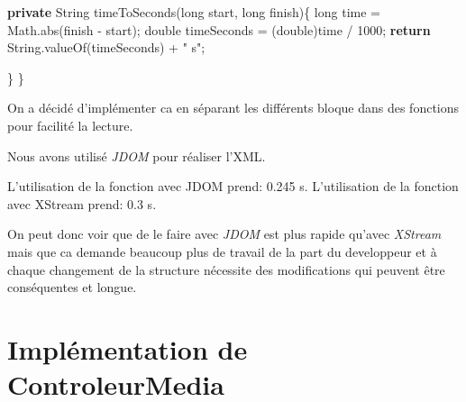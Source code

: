 \documentclass[]{article}
\newenvironment{Shaded}{}{}
\newcommand{\KeywordTok}[1]{\textcolor[rgb]{0.00,0.44,0.13}{\textbf{{#1}}}}
\newcommand{\DataTypeTok}[1]{\textcolor[rgb]{0.56,0.13,0.00}{{#1}}}
\newcommand{\DecValTok}[1]{\textcolor[rgb]{0.25,0.63,0.44}{{#1}}}
\newcommand{\StringTok}[1]{\textcolor[rgb]{0.25,0.44,0.63}{{#1}}}
\newcommand{\FunctionTok}[1]{\textcolor[rgb]{0.02,0.16,0.49}{{#1}}}
\newcommand{\BuiltInTok}[1]{{#1}}
\newcommand{\NormalTok}[1]{{#1}}
\begin{document}
\begin{Shaded}
\begin{Highlighting}[]
	\KeywordTok{private} \BuiltInTok{String} \FunctionTok{timeToSeconds}\NormalTok{(}\DataTypeTok{long} \NormalTok{start, }\DataTypeTok{long} \NormalTok{finish)\{}
		\DataTypeTok{long} \NormalTok{time = }\BuiltInTok{Math}\NormalTok{.}\FunctionTok{abs}\NormalTok{(finish - start);}
		\DataTypeTok{double} \NormalTok{timeSeconds = (}\DataTypeTok{double}\NormalTok{)time / }\DecValTok{1000}\NormalTok{;}
		\KeywordTok{return} \BuiltInTok{String}\NormalTok{.}\FunctionTok{valueOf}\NormalTok{(timeSeconds) + }\StringTok{" s"}\NormalTok{;}

	\NormalTok{\}}
\NormalTok{\}}
\end{Highlighting}
\end{Shaded}

On a décidé d'implémenter ca en séparant les différents bloque dans des
fonctions pour facilité la lecture.

Nous avons utilisé \emph{JDOM} pour réaliser l'XML.

L'utilisation de la fonction avec JDOM prend: 0.245 s. L'utilisation de
la fonction avec XStream prend: 0.3 s.

On peut donc voir que de le faire avec \emph{JDOM} est plus rapide
qu'avec \emph{XStream} mais que ca demande beaucoup plus de travail de
la part du developpeur et à chaque changement de la structure nécessite
des modifications qui peuvent être conséquentes et longue.

\section{Implémentation de ControleurMedia}\label{header-n87}
\end{document}

